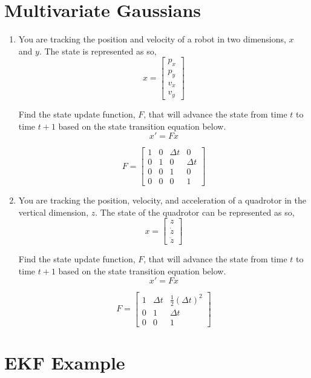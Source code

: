 \documentclass[10pt]{article}
\begin{document}
\section*{\normalsize Multivariate Gaussians}

\begin{enumerate}
	\item You are tracking the position and velocity of a robot in two dimensions, $x$ and $y$. The state is represented as so,
	$$x = \begin{bmatrix}
	p_x\\
	p_y\\
	v_x\\
	v_y
	\end{bmatrix}$$
	
	Find the state update function, $F$, that will advance the state from time $t$ to time $t + 1$ based on the state transition equation below.
	$$x' = Fx$$
	
	$$F = \begin{bmatrix}
	1 & 0 & \Delta t & 0\\
	0 & 1 & 0 & \Delta t\\
	0 & 0 & 1 & 0\\
	0 & 0 & 0 & 1
	\end{bmatrix}$$
	
	\item You are tracking the position, velocity, and acceleration of a quadrotor in the vertical dimension, $z$. The state of the quadrotor can be represented as so,
	$$x = \begin{bmatrix}
	z\\
	\dot z\\
	\ddot z
	\end{bmatrix}$$
	
	Find the state update function, $F$, that will advance the state from time $t$ to time $t + 1$ based on the state transition equation below.
	$$x' = Fx$$
	
	$$F = \begin{bmatrix}
	1 & \Delta t & \frac{1}{2} (\Delta t)^2\\
	0 & 1 & \Delta t\\
	0 & 0 & 1
	\end{bmatrix}$$
\end{enumerate}

\section*{\normalsize EKF Example}
\end{document}
